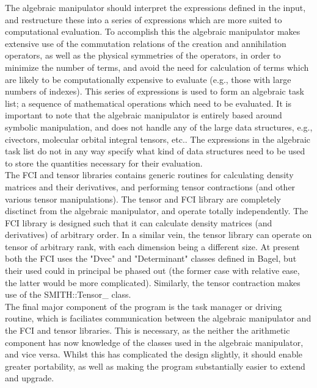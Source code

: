 \documentclass[12pt]{article}
\begin{document}
\noindent The algebraic manipulator should interpret the expressions defined
in the input, and restructure these into a series of expressions which are
more suited to computational evaluation. To accomplish this the
algebraic manipulator makes extensive use of the commutation
relations of the creation and annihilation operators, as well as the physical
symmetries of the operators, in order to minimize the number of terms, and
avoid the need for calculation of terms which are likely to be computationally
expensive to evaluate (e.g., those with large numbers of indexes). This series
of expressions is used to form an algebraic task list; a sequence of
mathematical operations which need to be evaluated.  It is important to note
that the algebraic manipulator is entirely based around symbolic manipulation,
and does not handle any of the large data structures, e.g., civectors,
molecular orbital integral tensors, etc.. The expressions in the algebraic
task list do not in any way specify what kind of data structures need to
be used to store the quantities necessary for their evaluation.\\

\noindent The FCI and tensor libraries contains generic routines for
calculating density matrices and their derivatives, and performing tensor
contractions (and other various tensor manipulations). The tensor and FCI
library are completely disctinct from the algebraic manipulator, and operate
totally independently. The FCI library is designed such that it can calculate
density matrices (and derivatives) of arbitrary order. In a similar vein, the
tensor library can operate on tensor of arbitrary rank, with each dimension
being a different size. At present both the FCI uses the "Dvec"
and "Determinant" classes defined in Bagel, but their used could in principal be
phased out (the former case with relative ease, the latter would be more complicated).
Similarly, the tensor contraction makes use of the SMITH::Tensor\_ class. \\

\noindent The final major component of the program is the task manager or driving routine, 
which is faciliates communication between the algebraic manipulator and the 
FCI and tensor libraries. This is necessary, as
the neither the arithmetic component has now knowledge of the classes used in
the algebraic manipulator, and vice versa. Whilst this has complicated the
design slightly, it should enable greater portability, as well as making the
program substantially easier to extend and upgrade.\\ 
\end{document}
